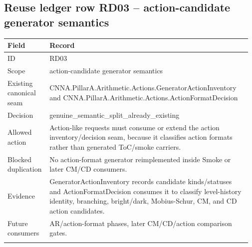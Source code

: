 \subsection*{Reuse ledger row RD03 -- action-candidate generator semantics}
\begin{longtable}{L{0.16\linewidth} L{0.81\linewidth}}
\hline
\textbf{Field} & \textbf{Record}\\
\hline
ID & RD03\\
\hline\addlinespace[0.20em]
Scope & action-candidate generator semantics\\
\hline\addlinespace[0.20em]
Existing canonical seam & CNNA.PillarA.Arithmetic.Actions.GeneratorActionInventory and CNNA.PillarA.Arithmetic.Actions.ActionFormatDecision\\
\hline\addlinespace[0.20em]
Decision & genuine\_semantic\_split\_already\_existing\\
\hline\addlinespace[0.20em]
Allowed action & Action-like requests must consume or extend the action inventory/\allowbreak{}decision seam, because it classifies action formats rather than generated ToC/\allowbreak{}smoke carriers.\\
\hline\addlinespace[0.20em]
Blocked duplication & No action-format generator reimplemented inside Smoke or later CM/\allowbreak{}CD consumers.\\
\hline\addlinespace[0.20em]
Evidence & GeneratorActionInventory records candidate kinds/\allowbreak{}statuses and ActionFormatDecision consumes it to classify level-history identity, branching, bright/\allowbreak{}dark, Mobius-Schur, CM, and CD action candidates.\\
\hline\addlinespace[0.20em]
Future consumers & AR/\allowbreak{}action-format phases, later CM/\allowbreak{}CD/\allowbreak{}action comparison gates.\\
\hline\addlinespace[0.20em]
\end{longtable}
